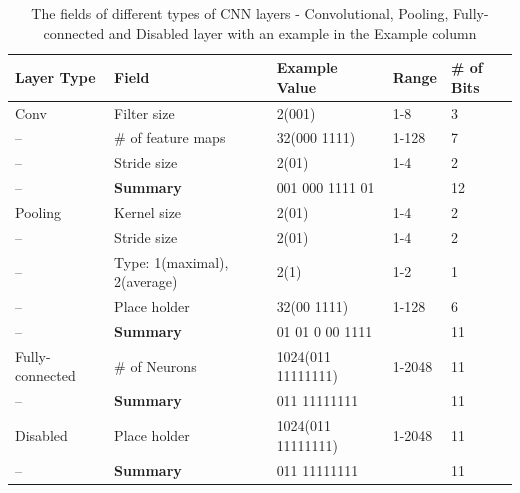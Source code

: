 \documentclass[conference]{IEEEtran}
\begin{document}
\begin{table}[!t]
	\renewcommand{\arraystretch}{1.3}
	\caption{The fields of different types of CNN layers - Convolutional, Pooling, Fully-connected and Disabled layer with an example in the Example column}
	\label{table:CNNFields}
	\centering
	\begin{tabular}{|p{1.5cm}|p{1.5cm}|p{1.5cm}|p{1.5cm}|p{1cm}|}
		\hline
		Layer Type & Field & Example Value & Range & \# of Bits\\
		\hline
		Conv & Filter size & 2(001) & 1-8 & 3\\
		\hline
		-- & \# of feature maps & 32(000 1111) & 1-128 & 7\\
		\hline
		-- & Stride size & 2(01) & 1-4 & 2\\
		\hline
		-- & \textbf{Summary} & 001 000 1111 01 &  & 12\\
		\hline
		Pooling & Kernel size & 2(01) & 1-4 & 2\\
		\hline
		-- & Stride size & 2(01) & 1-4 & 2\\
		\hline
		-- & Type: 1(maximal), 2(average) & 2(1) & 1-2 & 1\\
		\hline
		-- & Place holder & 32(00 1111) & 1-128 & 6\\
		\hline
		-- & \textbf{Summary} & 01 01 0 00 1111 &  & 11\\
		\hline
		Fully-connected & \# of Neurons & 1024(011 11111111) & 1-2048 & 11\\
		\hline
		-- & \textbf{Summary} & 011 11111111 &  & 11\\
		\hline
		Disabled & Place holder & 1024(011 11111111) & 1-2048 & 11\\
		\hline
		-- & \textbf{Summary} & 011 11111111 &  & 11\\
		\hline
	\end{tabular}
\end{table}
\end{document}
